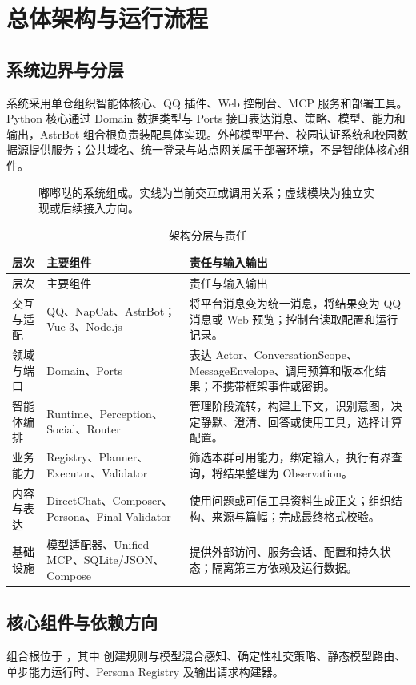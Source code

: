 \section{总体架构与运行流程}
\subsection{系统边界与分层}
系统采用单仓组织智能体核心、QQ 插件、Web 控制台、MCP 服务和部署工具。Python 核心通过 Domain 数据类型与 Ports 接口表达消息、策略、模型、能力和输出，AstrBot 组合根负责装配具体实现。外部模型平台、校园认证系统和校园数据源提供服务；公共域名、统一登录与站点网关属于部署环境，不是智能体核心组件。

\begin{figure}[H]\centering

\caption{嘟嘟哒的系统组成。实线为当前交互或调用关系；虚线模块为独立实现或后续接入方向。}
\label{fig:architecture}
\end{figure}

\begin{longtable}{@{}L{24mm}L{45mm}L{80mm}@{}}
\caption{架构分层与责任}\label{tab:layers}\\\toprule
层次 & 主要组件 & 责任与输入输出\\\midrule\endfirsthead
\toprule 层次 & 主要组件 & 责任与输入输出\\\midrule\endhead
交互与适配 & QQ、NapCat、AstrBot；Vue 3、Node.js & 将平台消息变为统一消息，将结果变为 QQ 消息或 Web 预览；控制台读取配置和运行记录。\\
领域与端口 & Domain、Ports & 表达 Actor、ConversationScope、MessageEnvelope、调用预算和版本化结果；不携带框架事件或密钥。\\
智能体编排 & Runtime、Perception、Social、Router & 管理阶段流转，构建上下文，识别意图，决定静默、澄清、回答或使用工具，选择计算配置。\\
业务能力 & Registry、Planner、Executor、Validator & 筛选本群可用能力，绑定输入，执行有界查询，将结果整理为 Observation。\\
内容与表达 & DirectChat、Composer、Persona、Final Validator & 使用问题或可信工具资料生成正文；组织结构、来源与篇幅；完成最终格式校验。\\
基础设施 & 模型适配器、Unified MCP、SQLite/JSON、Compose & 提供外部访问、服务会话、配置和持久状态；隔离第三方依赖及运行数据。\\\bottomrule
\end{longtable}

\subsection{核心组件与依赖方向}
组合根位于 ，其中  创建规则与模型混合感知、确定性社交策略、静态模型路由、单步能力运行时、Persona Registry 及输出请求构建器。

